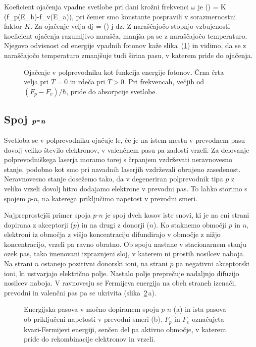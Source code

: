 Koeficient ojačenja vpadne svetlobe pri dani krožni
frekvenci $\omega$ je
\beq
\gamma(\omega) = K \left(f_p(E_b)-f_v(E_a)\right),
\label{eq:gainSC}
\eeq
pri čemer smo konstante pospravili v sorazmernostni faktor $K$. Za ojačenje velja
\beq
dj = \gamma(\omega) j dz.
\eeq
Z naraščajočo stopnjo vzbujenosti 
koeficient ojačenja razumljivo narašča, manjša pa se z naraščajočo 
temperaturo. Njegovo odvisnost od energije vpadnih fotonov kaže slika~(\ref{s6.11}) in vidimo,
da se z naraščajočo temperaturo zmanjšuje tudi širina pasu, v katerem pride do ojačenja.
\begin{figure}[h]
\centering
\def\svgwidth{80truemm} 

\caption{Ojačenje v polprevodniku kot funkcija energije fotonov. Črna črta
velja pri $T=0$ in rdeča pri $T>0$. Pri frekvencah, večjih od $(F_p-F_v)/\hbar$,
pride do absorpcije svetlobe. 
}
\label{s6.11}
\end{figure}

\subsection*{Spoj $\textbf{\textit{p}}$-$\textbf{\textit{n}}$}
Svetloba se v polprevodniku ojačuje le, če je na istem mestu v prevodnem pasu
dovolj veliko število elektronov, v valenčnem pasu pa zadosti vrzeli. Za delovanje
polprevodniškega laserja moramo torej s črpanjem vzdrževati neravnovesno stanje, 
podobno kot smo pri navadnih laserjih vzdrževali obrnjeno zasedenost. 
Neravnovesno stanje dosežemo tako, da v degeneriran polprevodnik tipa $p$ z 
veliko vrzeli dovolj hitro dodajamo elektrone v prevodni pas. To lahko storimo s spojem
$p$-$n$, na katerega priključimo napetost v prevodni smeri. 

Najpreprostejši primer spoja $p$-$n$ je spoj dveh kosov iste snovi, ki je
na eni strani dopirana z akceptorji ($p$) in na drugi z donorji ($n$). 
Ko staknemo območji $p$ in $n$, elektroni iz območja z višjo koncentracijo 
difundirajo v območje z nižjo koncentracijo, vrzeli pa ravno obratno. 
Ob spoju nastane v stacionarnem stanju ozek pas, tako imenovani izpraznjeni sloj, 
v katerem ni prostih nosilcev naboja. Na strani $n$ ostanejo pozitivni donorski ioni, 
na strani $p$ pa negativni akceptorski ioni, ki ustvarjajo električno polje. 
Nastalo polje preprečuje nadaljnjo difuzijo nosilcev naboja. 
V ravnovesju se Fermijeva energija na obeh straneh izenači, 
prevodni in valenčni pas pa se ukrivita (slika~\ref{fig:pnlaser}\,a).
\begin{figure}[h]
\centering
\def\svgwidth{150truemm} 

\caption{Energijska pasova v močno dopiranem spoju $p$-$n$ (a) in 
ista pasova ob priključeni napetosti v prevodni smeri (b). $F_p$ in $F_v$
označujeta kvazi-Fermijevi energiji, senčen del pa aktivno območje, 
v katerem pride do rekombinacije elektronov in vrzeli.
}
\label{fig:pnlaser}
\end{figure}

